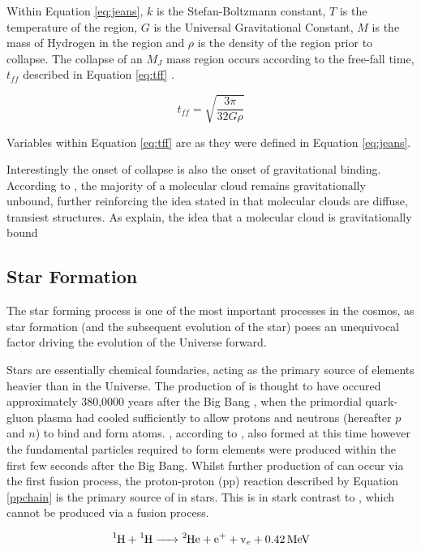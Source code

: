 \documentclass{report}
\begin{document}
Within Equation \ref{eq:jeans}, $k$ is the Stefan-Boltzmann constant, $T$ is the temperature of the region, $G$ is the Universal Gravitational Constant, $M$ is the mass of Hydrogen in the region and $\rho$ is the density of the region prior to collapse. The collapse of an $M_{J}$ mass region occurs according to the free-fall time, $t_{ff}$ described in Equation \ref{eq:tff} \parencite{krumholz}.

\begin{equation}\label{eq:tff}
  t_{ff} = \sqrt{\frac{3\pi}{32G\rho}}
\end{equation}

Variables within Equation \ref{eq:tff} are as they were defined in Equation \ref{eq:jeans}.

Interestingly the onset of collapse is also the onset of gravitational binding. According to \textcite{bound}, the majority of a molecular cloud remains gravitationally unbound, further reinforcing the idea stated in \textcite{evo-mol} that molecular clouds are diffuse, transiest structures. As \textcite{bound} explain, the idea that a molecular cloud is gravitationally bound

\subsection{Star Formation}
The star forming process is one of the most important processes in the cosmos, as star formation (and the subsequent evolution of the star) poses an unequivocal factor driving the evolution of the Universe forward.

Stars are essentially chemical foundaries, acting as the primary source of elements heavier than  in the Universe. The production of  is thought to have occured approximately 380,0000 years after the Big Bang \parencite{peebles}, when the primordial quark-gluon plasma had cooled sufficiently to allow protons and neutrons (hereafter $p$ and $n$) to bind and form atoms. , according to \textcite{bbc}, also formed at this time however the fundamental particles required to form elements were produced within the first few seconds after the Big Bang. Whilst further production of  can occur via the first fusion process, the proton-proton (pp) reaction described by Equation \ref{ppchain} \parencite{synthesis} is the primary source of  in stars. This is in stark contrast to , which cannot be produced via a fusion process.

\begin{equation} \label{ppchain}
  \ce{^{1}{H} + ^{1}{H} -> ^{2}{He} + e^{+} + v_{e} + 0.42 MeV}
\end{equation}
\end{document}
